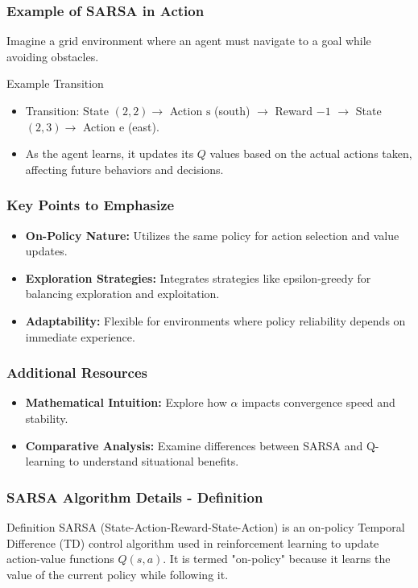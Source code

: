 \documentclass[aspectratio=169]{beamer}
\begin{document}
\begin{frame}[fragile]
    \frametitle{Example of SARSA in Action}
    Imagine a grid environment where an agent must navigate to a goal while avoiding obstacles. 

    \begin{block}{Example Transition}
        \begin{itemize}
            \item Transition: State $(2,2) \rightarrow$ Action $\text{s}$ (south) $\rightarrow$ Reward $-1$ $\rightarrow$ State $(2,3) \rightarrow$ Action $\text{e}$ (east).
        \end{itemize}
    \end{block}
    
    \begin{itemize}
        \item As the agent learns, it updates its $Q$ values based on the actual actions taken, affecting future behaviors and decisions.
    \end{itemize}
\end{frame}

\begin{frame}[fragile]
    \frametitle{Key Points to Emphasize}
    \begin{itemize}
        \item \textbf{On-Policy Nature:} Utilizes the same policy for action selection and value updates.
        \item \textbf{Exploration Strategies:} Integrates strategies like epsilon-greedy for balancing exploration and exploitation.
        \item \textbf{Adaptability:} Flexible for environments where policy reliability depends on immediate experience.
    \end{itemize}
\end{frame}

\begin{frame}[fragile]
    \frametitle{Additional Resources}
    \begin{itemize}
        \item \textbf{Mathematical Intuition:} Explore how $\alpha$ impacts convergence speed and stability.
        \item \textbf{Comparative Analysis:} Examine differences between SARSA and Q-learning to understand situational benefits.
    \end{itemize}
\end{frame}

\begin{frame}[fragile]
    \frametitle{SARSA Algorithm Details - Definition}
    \begin{block}{Definition}
        SARSA (State-Action-Reward-State-Action) is an on-policy Temporal Difference (TD) control algorithm used in reinforcement learning to update action-value functions \(Q(s, a)\). It is termed "on-policy" because it learns the value of the current policy while following it.
    \end{block}
\end{frame}
\end{document}
